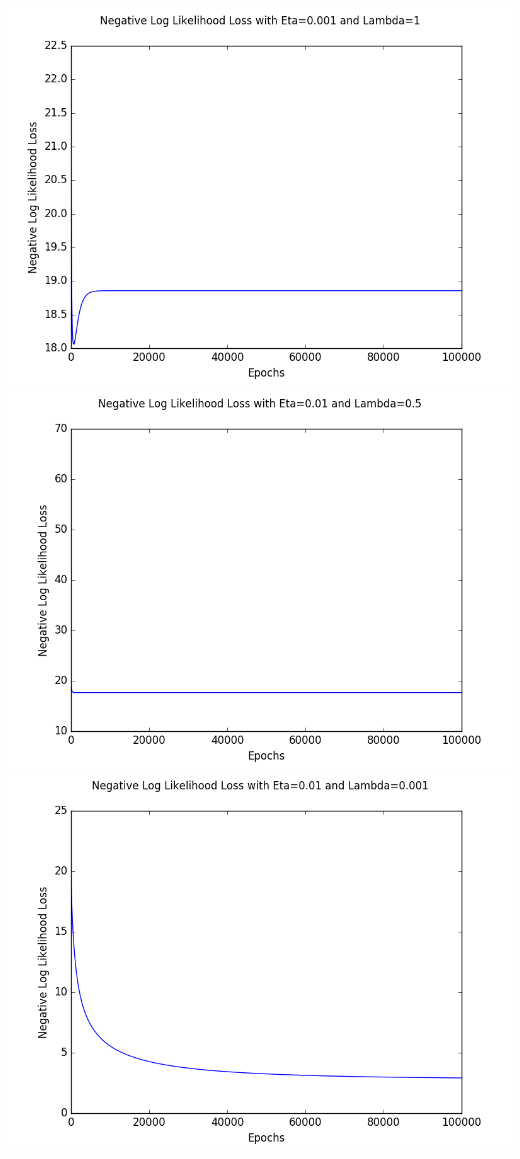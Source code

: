 \documentclass[submit]{harvardml}
\begin{document}
\begin{enumerate}
        \includegraphics[scale=.40]{hw2/P3_Pics/eta=0.001lam=1.png}
        \includegraphics[scale=.40]{hw2/P3_Pics/eta=0.01lam=.5.png}
        \includegraphics[scale=.40]{hw2/P3_Pics/eta=0.01lam=0.001.png}

\end{enumerate}
\end{document}
